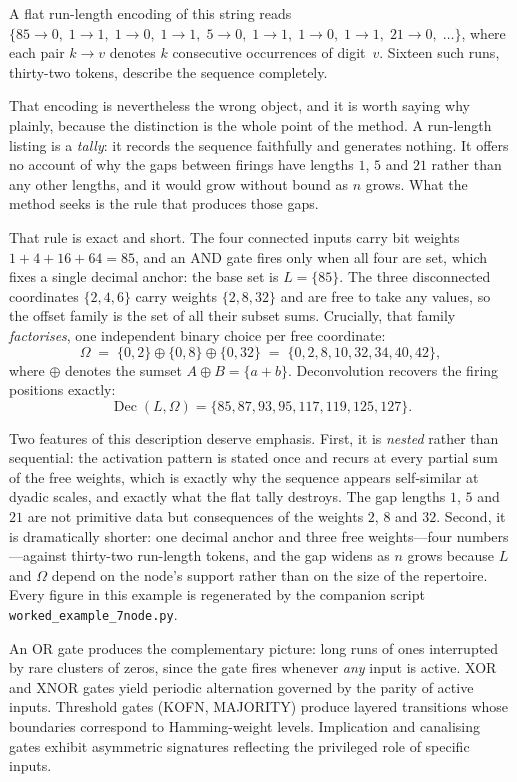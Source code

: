 \documentclass[11pt]{article}
\begin{document}
A flat run-length encoding of this string reads
$\{85 \!\to\! 0,\; 1 \!\to\! 1,\; 1 \!\to\! 0,\; 1 \!\to\! 1,\;
5 \!\to\! 0,\; 1 \!\to\! 1,\; 1 \!\to\! 0,\; 1 \!\to\! 1,\;
21 \!\to\! 0,\; \ldots\}$, where each pair $k \!\to\! v$ denotes $k$
consecutive occurrences of digit~$v$.  Sixteen such runs, thirty-two
tokens, describe the sequence completely.

That encoding is nevertheless the wrong object, and it is worth saying why
plainly, because the distinction is the whole point of the method.  A
run-length listing is a \emph{tally}: it records the sequence faithfully and
generates nothing.  It offers no account of why the gaps between firings have
lengths $1$, $5$ and $21$ rather than any other lengths, and it would grow
without bound as $n$ grows.  What the method seeks is the rule that produces
those gaps.

That rule is exact and short.  The four connected inputs carry bit weights
$1+4+16+64=85$, and an AND gate fires only when all four are set, which fixes
a single decimal anchor: the base set is $L=\{85\}$.  The three disconnected
coordinates $\{2,4,6\}$ carry weights $\{2,8,32\}$ and are free to take any
values, so the offset family is the set of all their subset sums.  Crucially,
that family \emph{factorises}, one independent binary choice per free
coordinate:
\[
\Omega \;=\; \{0,2\}\oplus\{0,8\}\oplus\{0,32\}
\;=\;\{0,2,8,10,32,34,40,42\},
\]
where $\oplus$ denotes the sumset $A\oplus B=\{a+b\}$.  Deconvolution
recovers the firing positions exactly:
\[
\operatorname{Dec}(L,\Omega)=\{85,87,93,95,117,119,125,127\}.
\]

Two features of this description deserve emphasis.  First, it is
\emph{nested} rather than sequential: the activation pattern is stated once
and recurs at every partial sum of the free weights, which is exactly why the
sequence appears self-similar at dyadic scales, and exactly what the flat
tally destroys.  The gap lengths $1$, $5$ and $21$ are not primitive data but
consequences of the weights $2$, $8$ and $32$.  Second, it is dramatically
shorter: one decimal anchor and three free weights---four numbers---against
thirty-two run-length tokens, and the gap widens as $n$ grows because $L$ and
$\Omega$ depend on the node's support rather than on the size of the
repertoire.  Every figure in this example is regenerated by the companion
script \texttt{worked\_example\_7node.py}.

An OR gate produces the complementary picture: long runs of ones
interrupted by rare clusters of zeros, since the gate fires whenever
\emph{any} input is active.  XOR and XNOR gates yield periodic
alternation governed by the parity of active inputs.  Threshold gates
(KOFN, MAJORITY) produce layered transitions whose boundaries correspond
to Hamming-weight levels.  Implication and canalising gates exhibit
asymmetric signatures reflecting the privileged role of specific inputs.
\end{document}
